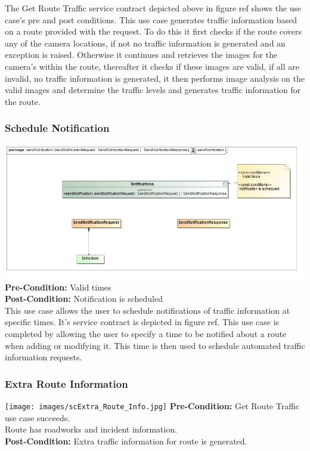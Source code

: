 \documentclass[a4paper,12pt]{article}
\begin{document}
The Get Route Traffic service contract depicted above in {figure ref} shows the use case's pre and post conditions. This use case generates traffic information based on a route provided with the request. To do this it first checks if the route covers any of the camera locations, if not no traffic information is generated and an exception is raised. Otherwise it continues and retrieves the images for the camera's within the route, thereafter it checks if these images are valid, if all are invalid, no traffic information is generated, it then performs image analysis on the valid images and determine the traffic levels and generates traffic information for the route.

\subsubsection{Schedule Notification}
\includegraphics[width=\textwidth]{images/scSchedule_Notification.jpg}
\textbf{Pre-Condition: }
Valid times\\
\textbf{Post-Condition: }
Notification is scheduled\\

This use case allows the user to schedule notifications of traffic information at specific times. It's service contract is depicted in {figure ref}. This use case is completed by allowing the user to specify a time to be notified about a route when adding or modifying it. This time is then used to schedule automated traffic information requests.

\subsubsection{Extra Route Information}
\texttt{[image: images/scExtra\_Route\_Info.jpg]}
\textbf{Pre-Condition: }
Get Route Traffic use case succeeds.\\
Route has roadworks and incident information.\\
\textbf{Post-Condition: }
Extra traffic information for route is generated.\\
\end{document}
